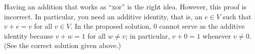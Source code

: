 \bigskip

 Having an addition that works as ``xor'' is the right idea.
However, this proof is incorrect.  In particular, you need an
additive identity, that is, an $e\in V$ such that $v + e = v$ for
all $v \in V$.  In the proposed solution, $0$ cannot serve as the additive identity
because $v+w = 1$ for all $w\neq v$; in particular, $v + 0 = 1$
whenever $v \neq 0$. (See the correct solution given above.)






